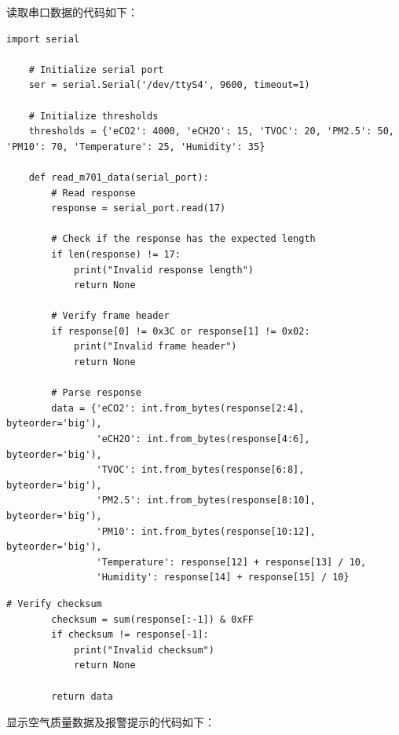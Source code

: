 \documentclass[12pt,hyperref,a4paper,UTF8]{ctexart}
\begin{document}
读取串口数据的代码如下：
\begin{lstlisting}[style=Pythonstyle,name=serial_read.py]
    import serial

    # Initialize serial port
    ser = serial.Serial('/dev/ttyS4', 9600, timeout=1)
    
    # Initialize thresholds
    thresholds = {'eCO2': 4000, 'eCH2O': 15, 'TVOC': 20, 'PM2.5': 50, 'PM10': 70, 'Temperature': 25, 'Humidity': 35}
    
    def read_m701_data(serial_port):
        # Read response
        response = serial_port.read(17)
    
        # Check if the response has the expected length
        if len(response) != 17:
            print("Invalid response length")
            return None
    
        # Verify frame header
        if response[0] != 0x3C or response[1] != 0x02:
            print("Invalid frame header")
            return None
    
        # Parse response
        data = {'eCO2': int.from_bytes(response[2:4], byteorder='big'),
                'eCH2O': int.from_bytes(response[4:6], byteorder='big'),
                'TVOC': int.from_bytes(response[6:8], byteorder='big'),
                'PM2.5': int.from_bytes(response[8:10], byteorder='big'),
                'PM10': int.from_bytes(response[10:12], byteorder='big'), 
                'Temperature': response[12] + response[13] / 10,
                'Humidity': response[14] + response[15] / 10}
\end{lstlisting}
\newpage
\begin{lstlisting}[style=Pythonstyle,name=serial_read.py]
        # Verify checksum
        checksum = sum(response[:-1]) & 0xFF
        if checksum != response[-1]:
            print("Invalid checksum")
            return None
    
        return data
\end{lstlisting}

显示空气质量数据及报警提示的代码如下：
\end{document}
